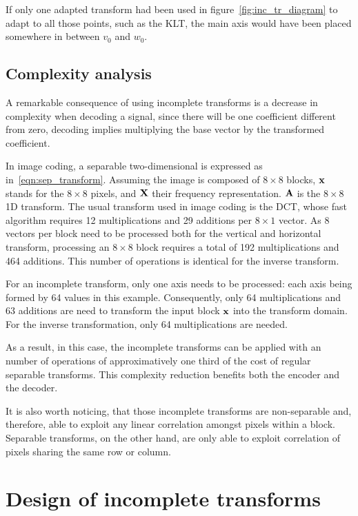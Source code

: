 \documentclass[11pt,a4paper,openright,twoside]{book}
\numberwithin{equation}{section} %
\numberwithin{figure}{section} %
\numberwithin{table}{section} %
\begin{document}
If only one adapted transform had been used in figure~\ref{fig:inc_tr_diagram}
to adapt to all those points, such as the \acl{KLT}, the main axis would have
been placed somewhere in between $v_0$ and $w_0$.

\subsection{Complexity analysis}
\label{sub:it_complexity_analysis}

A remarkable consequence of using incomplete transforms is a decrease in
complexity when decoding a signal, since there will be one coefficient
different from zero, decoding implies multiplying the base vector by the
transformed coefficient.

In image coding, a separable two-dimensional is expressed as
in~\eqref{eqn:sep_transform}.
Assuming the image is composed of $8\times8$ blocks, $\mathbf{x}$ stands for the
$8\times8$ pixels, and $\mathbf{X}$ their frequency representation.
$\mathbf{A}$ is the $8\times8$ 1D transform.
The usual transform used in image coding is the \ac{DCT}, whose fast algorithm
requires 12 multiplications and 29 additions per $8\times1$ vector.
As $8$ vectors per block need to be processed both for the vertical and
horizontal transform, processing an $8\times8$ block requires a total of 192
multiplications and 464 additions.
This number of operations is identical for the inverse transform.

For an incomplete transform, only one axis needs to be processed:
each axis being formed by 64 values in this example.
Consequently, only 64 multiplications and 63 additions are need to transform
the input block $\mathbf{x}$ into the transform domain.
For the inverse transformation, only 64 multiplications are needed.

As a result, in this case, the incomplete transforms can be applied with an
number of operations of approximatively one third of the cost of regular
separable transforms.
This complexity reduction benefits both the encoder and the decoder.

It is also worth noticing, that those incomplete transforms are non-separable
and, therefore, able to exploit any linear correlation amongst pixels
within a block.
Separable transforms, on the other hand, are only able to exploit correlation
of pixels sharing the same row or column.

\section{Design of incomplete transforms}
\label{sec:it_design_of_incomplete_transforms}
\end{document}
